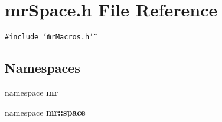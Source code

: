 \section{mr\-Space.h File Reference}
\label{mrSpace_8h}
{\tt \#include \char`\"{}mr\-Macros.h\char`\"{}}\par
\subsection*{Namespaces}
\begin{CompactItemize}
\item 
namespace {\bf mr}
\item 
namespace {\bf mr::space}
\end{CompactItemize}
